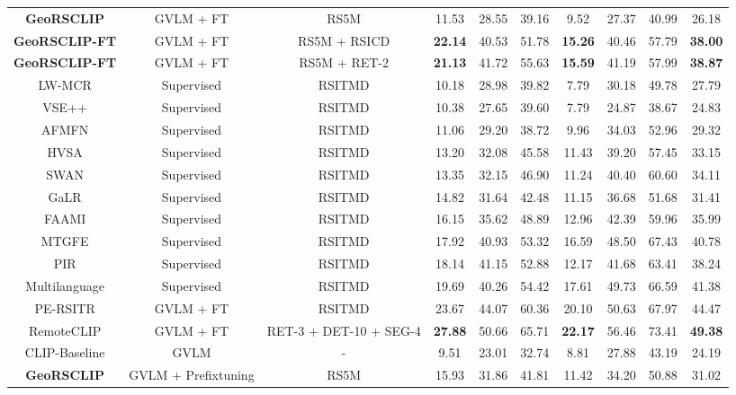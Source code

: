 \documentclass[journal]{IEEEtran}
\begin{document}
\begin{table*}
\begin{tabular}{cccccccccc}
\textbf{GeoRSCLIP}  & GVLM + FT & RS5M & 11.53   &	28.55  	& 39.16   & 	9.52   & 	27.37  	& 40.99   &	26.18  \\

\textbf{GeoRSCLIP-FT}  & GVLM + FT & RS5M + RSICD &\textbf{22.14} & 40.53 & 51.78&\textbf{15.26}&40.46& 57.79 & \textbf{38.00} \\
\textbf{GeoRSCLIP-FT}  & GVLM + FT & RS5M + RET-2 & \textbf{21.13}& 41.72& 55.63&\textbf{15.59} & 41.19 &57.99 & \textbf{38.87} \\
\midrule
LW-MCR \cite{LW-MCR}  & Supervised & RSITMD&10.18  & 28.98  & 39.82  & 7.79  & 30.18  & 49.78  & 27.79 \\ 
VSE++ \cite{vse++} & Supervised & RSITMD & 10.38  & 27.65  & 39.60  & 7.79  & 24.87  & 38.67  & 24.83  \\
AFMFN \cite{RSITMD} & Supervised & RSITMD & 11.06  & 29.20  & 38.72  & 9.96  & 34.03  & 52.96  & 29.32  \\
HVSA \cite{hvsa}  & Supervised & RSITMD&13.20  &32.08  &45.58  &11.43  &39.20  &57.45  & 33.15  \\ 
SWAN  & Supervised & RSITMD & 13.35  & 32.15  & 46.90  & 11.24  & 40.40  & 60.60  & 34.11  \\
GaLR \cite{galr} & Supervised & RSITMD & 14.82  & 31.64  & 42.48  & 11.15  & 36.68  & 51.68  & 31.41  \\
FAAMI \cite{Zheng_2023}  & Supervised & RSITMD & 16.15  & 35.62  & 48.89  & 12.96   & 42.39  & 59.96  & 35.99  \\ 
MTGFE \cite{MTGFE}  &Supervised& RSITMD & 17.92 & 40.93 & 53.32& 16.59&48.50 & 67.43 & 40.78\\
PIR \cite{pir}  & Supervised & RSITMD & 18.14  & 41.15  &52.88  & 12.17  & 41.68  & 63.41   & 38.24 \\ 
Multilanguage \cite{multilingual}  &Supervised& RSITMD & 19.69& 40.26& 54.42& 17.61& 49.73&66.59 & 41.38\\
PE-RSITR \cite{yuan2023parameterefficient}  & GVLM + FT & RSITMD & 23.67 & 44.07 & 60.36& 20.10&50.63 &67.97 & 44.47\\
RemoteCLIP \cite{liu2023remoteclip}  & GVLM + FT & RET-3 + DET-10 + SEG-4 & \textbf{27.88} & 50.66 & 65.71 & \textbf{22.17} & 56.46 & 73.41 & \textbf{49.38}\\
CLIP-Baseline \cite{clip}  & GVLM & - & 9.51 	& 23.01 &  	32.74 	& 8.81 	& 27.88  & 	43.19  & 	24.19  \\
\textbf{GeoRSCLIP}  &GVLM + Prefix\-tuning & RS5M & 15.93  &31.86  &41.81 & 11.42  & 34.20  &50.88  &31.02 \\

\end{tabular}
\end{table*}
\end{document}
